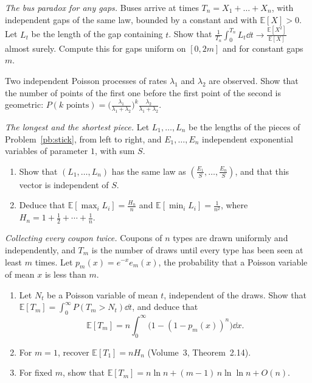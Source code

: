 \begin{exercise}[$\star\star$]\label{ex:bus}
\emph{The bus paradox for any gaps.} Buses arrive at times $T_n=X_1+\dots+X_n$, with independent gaps of the same law, bounded by a
constant and with $\mathbb E[X]>0$. Let $L_t$ be the length of the gap containing $t$. Show that $\frac1{T_n}\int_0^{T_n}L_t\dd t\to\frac{\mathbb E[X^2]}{\mathbb E[X]}$ almost surely. Compute this for
gaps uniform on $[0,2m]$ and for constant gaps $m$.
\end{exercise}

\begin{exercise}[$\star$]\label{ex:superpose}
Two independent Poisson processes of rates $\lambda_1$ and $\lambda_2$ are observed. Show that the number of points of the first one before the first
point of the second is geometric: $P(k\text{ points})=\bigl(\frac{\lambda_1}{\lambda_1+\lambda_2}\bigr)^k\frac{\lambda_2}{\lambda_1+\lambda_2}$.
\end{exercise}

\begin{exercise}[$\star\star$]\label{pb:spacings}
\emph{The longest and the shortest piece.} Let $L_1,\dots,L_n$ be the lengths of the pieces of Problem~\ref{pb:stick}, from left to right,
and $E_1,\dots,E_n$ independent exponential variables of parameter $1$, with sum $S$.
\begin{enumerate}[label=(\alph*)]
\item Show that $(L_1,\dots,L_n)$ has the same law as $(\frac{E_1}S,\dots,\frac{E_n}S)$, and that this vector is independent of $S$.
\item Deduce that $\mathbb E[\max_iL_i]=\frac{H_n}n$ and $\mathbb E[\min_iL_i]=\frac1{n^2}$, where $H_n=1+\frac12+\cdots+\frac1n$.
\end{enumerate}
\end{exercise}

\begin{exercise}[$\star\star\star$]\label{pb:dixie}
\emph{Collecting every coupon twice.} Coupons of $n$ types are drawn uniformly and independently, and $T_m$ is the number of draws until
every type has been seen at least $m$ times. Let $p_m(x)=e^{-x}e_m(x)$, the probability that a Poisson variable of mean $x$ is less than $m$.
\begin{enumerate}[label=(\alph*)]
\item Let $N_t$ be a Poisson variable of mean $t$, independent of the draws. Show that $\mathbb E[T_m]=\int_0^\infty P(T_m>N_t)\dd t$, and deduce that
\[
\mathbb E[T_m]=n\int_0^\infty\bigl(1-(1-p_m(x))^n\bigr)\dd x.
\]
\item For $m=1$, recover $\mathbb E[T_1]=nH_n$ (Volume~3, Theorem~2.14).
\item For fixed $m$, show that $\mathbb E[T_m]=n\ln n+(m-1)\,n\ln\ln n+O(n)$.
\end{enumerate}
\end{exercise}


